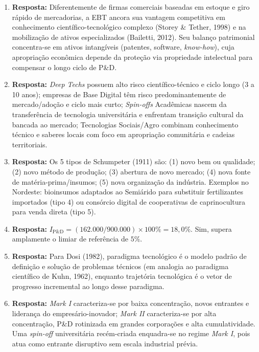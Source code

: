 \begin{boxGabarito}
\begin{enumerate}[leftmargin=1.6em, itemsep=4pt]
  \item \textbf{Resposta:} Diferentemente de firmas comerciais baseadas em estoque e giro rápido de mercadorias, a EBT ancora sua vantagem competitiva em conhecimento científico-tecnológico complexo (Storey \& Tether, 1998) e na mobilização de ativos especializados (Bailetti, 2012). Seu balanço patrimonial concentra-se em ativos intangíveis (patentes, software, \textit{know-how}), cuja apropriação econômica depende da proteção via propriedade intelectual para compensar o longo ciclo de P\&D.
  \item \textbf{Resposta:} \textit{Deep Techs} possuem alto risco científico-técnico e ciclo longo (3 a 10 anos); empresas de Base Digital têm risco predominantemente de mercado/adoção e ciclo mais curto; \textit{Spin-offs} Acadêmicas nascem da transferência de tecnologia universitária e enfrentam transição cultural da bancada ao mercado; Tecnologias Sociais/Agro combinam conhecimento técnico e saberes locais com foco em apropriação comunitária e cadeias territoriais.
  \item \textbf{Resposta:} Os 5 tipos de Schumpeter (1911) são: (1) novo bem ou qualidade; (2) novo método de produção; (3) abertura de novo mercado; (4) nova fonte de matéria-prima/insumos; (5) nova organização da indústria. Exemplos no Nordeste: bioinsumos adaptados ao Semiárido para substituir fertilizantes importados (tipo 4) ou consórcio digital de cooperativas de caprinocultura para venda direta (tipo 5).
  \item \textbf{Resposta:} $I_{\text{P\&D}} = (162.000 / 900.000) \times 100\% = 18{,}0\%$. Sim, supera amplamente o limiar de referência de $5\%$.
  \item \textbf{Resposta:} Para Dosi (1982), paradigma tecnológico é o modelo padrão de definição e solução de problemas técnicos (em analogia ao paradigma científico de Kuhn, 1962), enquanto trajetória tecnológica é o vetor de progresso incremental ao longo desse paradigma.
  \item \textbf{Resposta:} \textit{Mark I} caracteriza-se por baixa concentração, novos entrantes e liderança do empresário-inovador; \textit{Mark II} caracteriza-se por alta concentração, P\&D rotinizada em grandes corporações e alta cumulatividade. Uma \textit{spin-off} universitária recém-criada enquadra-se no regime \textit{Mark I}, pois atua como entrante disruptivo sem escala industrial prévia.

\end{enumerate}
\end{boxGabarito}
